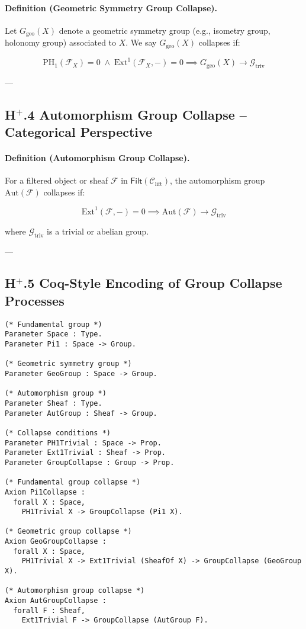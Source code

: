 \documentclass[11pt]{article}
\begin{document}
\paragraph{Definition (Geometric Symmetry Group Collapse).}

Let $G_{\mathrm{geo}}(X)$ denote a geometric symmetry group (e.g., isometry group, holonomy group) associated to $X$. We say $G_{\mathrm{geo}}(X)$ collapses if:

\[
\mathrm{PH}_1(\mathcal{F}_X) = 0 \;\land\; \mathrm{Ext}^1(\mathcal{F}_X, -) = 0 \implies G_{\mathrm{geo}}(X) \longrightarrow \mathcal{G}_{\mathrm{triv}}
\]

---

\subsection*{H$^{+}$.4 Automorphism Group Collapse – Categorical Perspective}

\paragraph{Definition (Automorphism Group Collapse).}

For a filtered object or sheaf $\mathcal{F}$ in $\mathsf{Filt}(\mathcal{C}_{\mathrm{lift}})$, the automorphism group $\mathrm{Aut}(\mathcal{F})$ collapses if:

\[
\mathrm{Ext}^1(\mathcal{F}, -) = 0 \implies \mathrm{Aut}(\mathcal{F}) \longrightarrow \mathcal{G}_{\mathrm{triv}}
\]

where $\mathcal{G}_{\mathrm{triv}}$ is a trivial or abelian group.

---

\subsection*{H$^{+}$.5 Coq-Style Encoding of Group Collapse Processes}

\begin{lstlisting}[language=Coq]
(* Fundamental group *)
Parameter Space : Type.
Parameter Pi1 : Space -> Group.

(* Geometric symmetry group *)
Parameter GeoGroup : Space -> Group.

(* Automorphism group *)
Parameter Sheaf : Type.
Parameter AutGroup : Sheaf -> Group.

(* Collapse conditions *)
Parameter PH1Trivial : Space -> Prop.
Parameter Ext1Trivial : Sheaf -> Prop.
Parameter GroupCollapse : Group -> Prop.

(* Fundamental group collapse *)
Axiom Pi1Collapse :
  forall X : Space,
    PH1Trivial X -> GroupCollapse (Pi1 X).

(* Geometric group collapse *)
Axiom GeoGroupCollapse :
  forall X : Space,
    PH1Trivial X -> Ext1Trivial (SheafOf X) -> GroupCollapse (GeoGroup X).

(* Automorphism group collapse *)
Axiom AutGroupCollapse :
  forall F : Sheaf,
    Ext1Trivial F -> GroupCollapse (AutGroup F).
\end{lstlisting}
\end{document}
